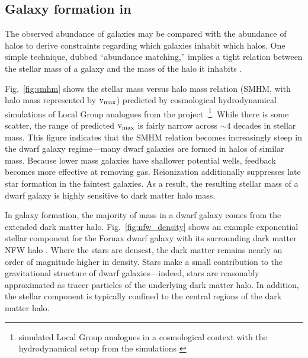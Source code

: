 \subsection{\texorpdfstring{Galaxy formation in
\LCDM{}}{Galaxy formation in }}\label{sec:galaxy_formation}

The observed abundance of galaxies may be compared with the abundance of
\LCDM{} halos to derive constraints regarding which galaxies inhabit
which halos. One simple technique, dubbed ``abundance matching,''
implies a tight relation between the stellar mass of a galaxy and the
mass of the halo it inhabits
\citep{li+white2009, moster+naab+white2013}.

Fig.~\ref{fig:smhm} shows the stellar mass versus halo mass relation
(SMHM, with halo mass represented by \({\rm v}_{\rm max}\)) predicted by \LCDM{}
cosmological hydrodynamical simulations of Local Group analogues from
the \apostle{} project \citep{sawala+2016}.\footnote{\apostle{}
  simulated Local Group analogues in a \LCDM{} cosmological context with
  the hydrodynamical setup from the \eagle{} simulations
  \citep{crain+2015, schaye+2015}}. While there is some scatter, the
range of predicted \({\rm v}_{\rm max}\) is fairly narrow across \(\sim 4\) decades
in stellar mass. This figure indicates that the SMHM relation becomes
increasingly steep in the dwarf galaxy regime---many dwarf galaxies are
formed in halos of similar mass. Because lower mass galaxies have
shallower potential wells, feedback becomes more effective at removing
gas. Reionization additionally suppresses late star formation in the
faintest galaxies. As a result, the resulting stellar mass of a dwarf
galaxy is highly sensitive to dark matter halo mass.

In \LCDM{} galaxy formation, the majority of mass in a dwarf galaxy
comes from the extended dark matter halo. Fig.~\ref{fig:nfw_density}
shows an example exponential stellar component for the Fornax dwarf
galaxy with its surrounding dark matter NFW halo \citep[with parameters
matching the][ and \citet{fattahi+2018} relations]{ludlow+2016}. Where
the stars are densest, the dark matter remains nearly an order of
magnitude higher in density. Stars make a small contribution to the
gravitational structure of dwarf galaxies---indeed, stars are reasonably
approximated as tracer particles of the underlying dark matter halo. In
addition, the stellar component is typically confined to the central
regions of the dark matter halo.

